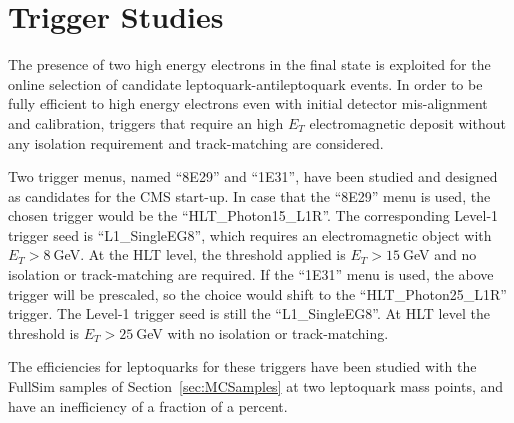%
\section{Trigger Studies} \label{sec:trig}

The presence of two high energy electrons in the final state is exploited for the online selection 
of candidate leptoquark-antileptoquark events.
In order to be fully efficient to high energy electrons even with initial detector mis-alignment 
and calibration, triggers that require an high $E_T$ electromagnetic deposit without any isolation 
requirement and track-matching are considered.

Two trigger menus, named ``8E29'' and ``1E31'', have been studied and designed as candidates 
for the CMS start-up.
In case that the ``8E29'' menu is used, the chosen trigger would be the ``HLT\_Photon15\_L1R''.
The corresponding Level-1 trigger seed is ``L1\_SingleEG8'', which requires an electromagnetic object with 
$E_T>8~$GeV. At the HLT level, the threshold applied is $E_T>15~$GeV and no isolation or track-matching
are required.
If the ``1E31'' menu is used, the above trigger will be prescaled, so the choice would shift to the
``HLT\_Photon25\_L1R'' trigger. The Level-1 trigger seed is still the ``L1\_SingleEG8''. At HLT level the 
threshold is $E_T>25~$GeV with no isolation or track-matching.

The efficiencies for leptoquarks for these triggers have been studied with the FullSim 
samples of Section~\ref{sec:MCSamples} at two leptoquark mass points, and have an inefficiency
of a fraction of a percent.







%

